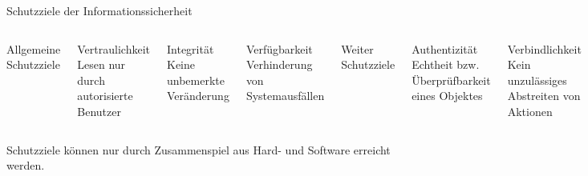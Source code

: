 \documentclass[10pt]{beamer}
\begin{document}
%
%
\begin{frame}[fragile]{Schutzziele der Informationssicherheit}
\begin{columns}[T,onlytextwidth]
	Allgemeine Schutzziele
	
	\begin{exampleblock}{Vertraulichkeit}
		Lesen nur durch autorisierte Benutzer
	\end{exampleblock}
	
	\begin{exampleblock}{Integrität}
		Keine unbemerkte Veränderung
	\end{exampleblock}
	
	\begin{exampleblock}{Verfügbarkeit}
		Verhinderung von Systemausfällen
	\end{exampleblock}
	
	Weiter Schutzziele
	
	\begin{exampleblock}{Authentizität}
		Echtheit bzw. Überprüfbarkeit eines Objektes
	\end{exampleblock}
	
	\begin{exampleblock}{Verbindlichkeit}
		Kein unzulässiges Abstreiten von Aktionen
	\end{exampleblock}
	
	\begin{exampleblock}{Zurechenbarkeit}
		Zuordnung einer Aktion auf Benutzer
	\end{exampleblock}
	
\end{columns}

Schutzziele können nur durch Zusammenspiel aus Hard- und Software erreicht werden.
\end{frame}
\end{document}
